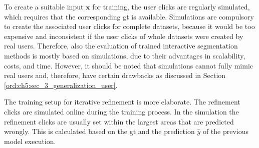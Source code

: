 To create a suitable input $\textbf{x}$ for training, the user clicks are regularly simulated, which requires that the corresponding \gls{gt} is available.
Simulations are compulsory to create the associated user clicks for complete datasets, because it would be too expensive and inconsistent if the user clicks of whole datasets were created by real users.
Therefore, also the evaluation of trained interactive segmentation methods is mostly based on simulations, due to their advantages in scalability, costs, and time.
However, it should be noted that simulations cannot fully mimic real users and, therefore, have certain drawbacks as discussed in Section \ref{ord:ch5:sec_3_generalization_user}.

The training setup for iterative refinement is more elaborate.
The refinement clicks are simulated online during the training process.
In the simulation the refinement clicks are usually set within the largest areas that are predicted wrongly.
This is calculated based on the \gls{gt} and the prediction $\hat{y}$ of the previous model execution.

